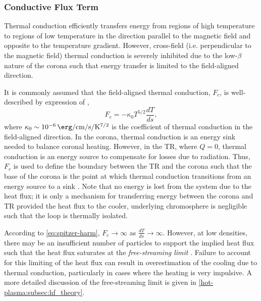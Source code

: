 \subsubsection{Conductive Flux Term}\label{sec:heat-flux}

Thermal conduction efficiently transfers energy from regions of high temperature to regions of low temperature in the direction parallel to the magnetic field and opposite to the temperature gradient. However, cross-field (i.e. perpendicular to the magnetic field) thermal conduction is severely inhibited due to the low-$\beta$ nature of the corona such that energy transfer is limited to the field-aligned direction. 

It is commonly assumed that the field-aligned thermal conduction, $F_c$, is well-described by expression of \citet{spitzer_transport_1953},
\begin{equation}\label{eq:spitzer-harm}
    F_c = -\kappa_0 T^{5/2} \frac{dT}{ds},
\end{equation}
where $\kappa_0\sim\SI{e-6}{\erg\per\cm\per\second\per\kelvin\tothe{7/2}}$ is the coefficient of thermal conduction in the field-aligned direction. In the corona, thermal conduction is an energy sink needed to balance coronal heating. However, in the TR, where $Q=0$, thermal conduction is an energy source to compensate for losses due to radiation. Thus, $F_c$ is used to define the boundary between the TR and the corona such that the base of the corona is the point at which thermal conduction transitions from an energy source to a sink \citep{vesecky_numerical_1979,bradshaw_new_2010}. Note that no energy is lost from the system due to the heat flux; it is only a mechanism for transferring energy between the corona and TR provided the heat flux to the cooler, underlying chromosphere is negligible such that the loop is thermally isolated.  

According to \autoref{eq:spitzer-harm}, $F_c\to\infty$ as $\frac{dT}{ds}\to\infty$. However, at low densities, there may be an insufficient number of particles to support the implied heat flux such that the heat flux saturates at the \textit{free-streaming limit} \citep{patsourakos_coronal_2005,bradshaw_explosive_2006,bradshaw_collisional_2013}. Failure to account for this limiting of the heat flux can result in overestimation of the cooling due to thermal conduction, particularly in cases where the heating is very impulsive. A more detailed discussion of the free-streaming limit is given in \autoref{hot-plasma:subsec:hf_theory}.

